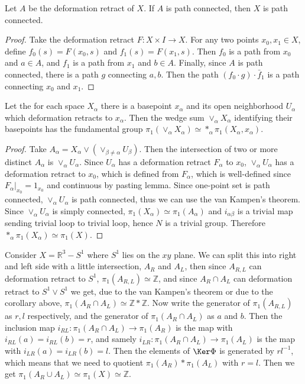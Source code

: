 \begin{lemma} Let $A$ be the deformation retract of $X$. If $A$ is path connected, then $X$ is path connected.
\end{lemma}
\begin{proof}
Take the deformation retract $F:X\times I\rightarrow X$. For any two points $x_0,x_1\in X$, define $f_0(s)=F(x_0,s)$ and $f_1(s)=F(x_1,s)$. Then $f_0$ is a path from $x_0$ and $a\in A$, and $f_1$ is a path from $x_1$ and $b\in A$. Finally, since $A$ is path connected, there is a path $g$ connecting $a,b$. Then the path $(f_0\cdot g)\cdot \bar{f}_1$ is a path connecting $x_0$ and $x_1$.
\end{proof}
\begin{cor} Let the for each space $X_\alpha$ there is a basepoint $x_\alpha$ and its open neighborhood $U_\alpha$ which deformation retracts to $x_\alpha$. Then the wedge sum $\vee_\alpha X_\alpha$ identifying their basepoints has the fundamental group $\pi_1(\vee_\alpha X_\alpha)\simeq *_\alpha \pi_1(X_\alpha,x_\alpha)$.
\end{cor}
\begin{proof} Take $A_\alpha=X_\alpha\vee\left(\vee_{\beta\neq \alpha}U_\beta\right)$. Then the intersection of two or more distinct $A_\alpha$ is $\vee_\alpha U_\alpha$. Since $U_\alpha$ has a deformation retract $F_\alpha$ to $x_0$, $\vee_\alpha U_\alpha$ has a deformation retract to $x_0$, which is defined from $F_\alpha$, which is well-defined since $F_\alpha|_{x_0}=1_{x_0}$ and continuous by pasting lemma. Since one-point set is path connected, $\vee_\alpha U_\alpha$ is path connected, thus we can use the van Kampen's theorem. Since $\vee_\alpha U_\alpha$ is simply connected, $\pi_1(X_\alpha)\simeq \pi_1(A_\alpha)$ and $i_{\alpha\beta}$ is a trivial map sending trivial loop to trivial loop, hence $N$ is a trivial group. Therefore $*_\alpha\pi_1(X_\alpha)\simeq \pi_1(X)$.
\end{proof}

\begin{exmp} Consider $X=\mathbb{R}^3-S^1$ where $S^1$ lies on the $xy$ plane. We can split this into right and left side with a little intersection, $A_R$ and $A_L$, then since $A_{R,L}$ can deformation retract to $S^1$, $\pi_1(A_{R,L})\simeq \mathbb{Z}$, and since $A_R\cap A_L$ can deformation retract to $S^1\vee S^1$ we get, due to the van Kampen's theorem or due to the corollary above, $\pi_1(A_{R}\cap A_L)\simeq \mathbb{Z}*\mathbb{Z}$. Now write the generator of $\pi_1(A_{R,L})$ as $r,l$ respectively, and the generator of $\pi_1(A_{R}\cap A_L)$ as $a$ and $b$. Then the inclusion map $i_{RL}:\pi_1(A_R\cap A_L)\rightarrow \pi_1(A_R)$ is the map with $i_{RL}(a)=i_{RL}(b)=r$, and samely $i_{LR}:\pi_1(A_R\cap A_L)\rightarrow \pi_1(A_L)$ is the map with $i_{LR}(a)=i_{LR}(b)=l$. Then the elements of $\Ker \Phi$ is generated by $rl^{-1}$, which means that we need to quotient $\pi_1(A_R)*\pi_1(A_L)$ with $r=l$. Then we get $\pi_1(A_R\cup A_L)\simeq \pi_1(X)\simeq \mathbb{Z}$.
\end{exmp}

